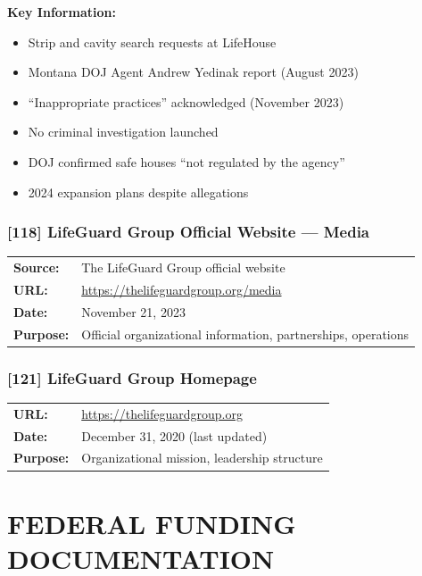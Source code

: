\documentclass[11pt,letterpaper]{article}
\newcommand{\citeref}[1]{\textbf{\color{NavyBlue}[#1]}}
\begin{document}
\vspace{0.1in}

\textbf{Key Information:}
\begin{itemize}[leftmargin=*]
\item Strip and cavity search requests at LifeHouse
\item Montana DOJ Agent Andrew Yedinak report (August 2023)
\item ``Inappropriate practices'' acknowledged (November 2023)
\item No criminal investigation launched
\item DOJ confirmed safe houses ``not regulated by the agency''
\item 2024 expansion plans despite allegations
\end{itemize}

\subsubsection{\citeref{118} LifeGuard Group Official Website --- Media}

\begin{tabular}{@{}p{1.4in}p{4.6in}@{}}
\textbf{Source:} & The LifeGuard Group official website\\
\textbf{URL:} & \url{https://thelifeguardgroup.org/media}\\
\textbf{Date:} & November 21, 2023\\
\textbf{Purpose:} & Official organizational information, partnerships, operations\\
\end{tabular}

\subsubsection{\citeref{121} LifeGuard Group Homepage}

\begin{tabular}{@{}p{1.4in}p{4.6in}@{}}
\textbf{URL:} & \url{https://thelifeguardgroup.org}\\
\textbf{Date:} & December 31, 2020 (last updated)\\
\textbf{Purpose:} & Organizational mission, leadership structure\\
\end{tabular}

\newpage

\section{FEDERAL FUNDING DOCUMENTATION}
\end{document}
